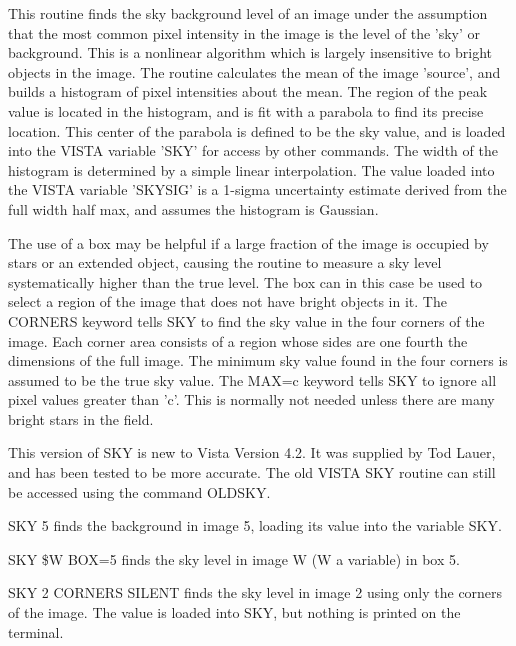 This routine finds the sky background level of an image under the
assumption that the most common pixel intensity in the image is the level
of the 'sky' or background.  This is a nonlinear algorithm which is largely
insensitive to bright objects in the image. The routine calculates the mean
of the image 'source', and builds a histogram of pixel intensities about
the mean. The region of the peak value is located in the histogram, and is
fit with a parabola to find its precise location. This center of the
parabola is defined to be the sky value, and is loaded into the VISTA
variable 'SKY' for access by other commands.  The width of the histogram is
determined by a simple linear interpolation.  The value loaded into the
VISTA variable 'SKYSIG' is a 1-sigma uncertainty estimate derived from the
full width half max, and assumes the histogram is Gaussian.

The use of a box may be helpful if a large fraction of the image is
occupied by stars or an extended object, causing the routine to measure a
sky level systematically higher than the true level.  The box can in this
case be used to select a region of the image that does not have bright
objects in it.  The CORNERS keyword tells SKY to find the sky value in the
four corners of the image.  Each corner area consists of a region whose
sides are one fourth the dimensions of the full image.  The minimum sky
value found in the four corners is assumed to be the true sky value.  The
MAX=c keyword tells SKY to ignore all pixel values greater than 'c'.  This
is normally not needed unless there are many bright stars in the field.

This version of SKY is new to Vista Version 4.2. It was supplied by Tod
Lauer, and has been tested to be more accurate. The old VISTA SKY routine
can still be accessed using the command OLDSKY.

\begin{example}
  \item[SKY 5\hfill]{ finds the background in image 5, loading 
  its value into the variable SKY.}
  \item[SKY \$W BOX=5\hfill]{finds the sky level in image W
  (W a variable) in box 5.}
  \item[SKY 2 CORNERS SILENT\hfill]{finds the sky level in image 2 using
  only the corners of the image.  The value is loaded into SKY, but nothing
  is printed on the terminal.}
\end{example}

